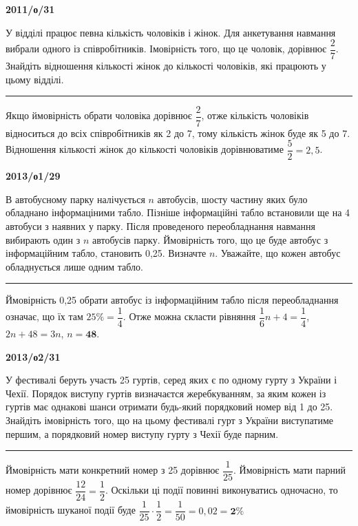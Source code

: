 \documentclass[12pt,a4paper]{article}  %
\begin{document}
\vspace{20pt}
\par\medskip \textbf{2011/о/31}\par

У відділі працює певна кількість чоловіків і жінок. Для анкетування навмання вибрали одного із співробітників. Імовірність того, що це чоловік, дорівнює $\dfrac{2}{7}$. Знайдіть відношення кількості жінок до кількості чоловіків, які працюють у цьому відділі.

\noindent\rule[0.5ex]{\linewidth}{1pt}

Якщо ймовірність обрати чоловіка дорівнює $\dfrac{2}{7}$, отже кількість чоловіків відноситься до всіх співробітників як 2 до 7, тому кількість жінок буде як 5 до 7. Відношення кількості жінок до кількості чоловіків дорівнюватиме $\dfrac{5}{2} = 2,5$.

\vspace{20pt}
\par\medskip \textbf{2013/о1/29}\par

В автобусному парку налічується $n$ автобусів, шосту частину яких було обладнано інформаціними табло. Пізніше інформаційні табло встановили ще на 4 автобуси з наявних у парку. Після проведеного переобладнання навмання вибирають один з $n$ автобусів парку. Ймовірність того, що це буде автобус з інформаційним табло, становить 0,25. Визначте $n$. Уважайте, що кожен автобус обладнується лише одним табло.

\noindent\rule[0.5ex]{\linewidth}{1pt}

Ймовірність 0,25 обрати автобус із інформаційним табло після переобладнання означає, що їх там $25\% = \dfrac{1}{4}$. Отже можна скласти рівняння $\dfrac{1}{6}n+4=\dfrac{1}{4}$, $2n+48=3n$, $n=\textbf{48}$.

\vspace{20pt}
\par\medskip \textbf{2013/о2/31}\par

У фестивалі беруть участь 25 гуртів, серед яких є по одному гурту з України і Чехії. Порядок виступу гуртів визначаєтся жеребкуванням, за яким кожен із гуртів має однакові шанси отримати будь-який порядковий номер від 1 до 25.
Знайдіть імовірність того, що на цьому фестивалі гурт з України виступатиме першим, а порядковий номер виступу гурту з Чехії буде парним.

\noindent\rule[0.5ex]{\linewidth}{1pt}
Ймовірність мати конкретний номер з 25 дорівнює $\dfrac{1}{25}$. Ймовірність мати парний номер дорівнює $\dfrac{12}{24}=\dfrac{1}{2}$. Оскільки ці події повинні виконуватись одночасно, то ймовірність шуканої події буде $\dfrac{1}{25}\cdot\dfrac{1}{2}=\dfrac{1}{50}=0,02=\textbf{2\%}$
\end{document}
